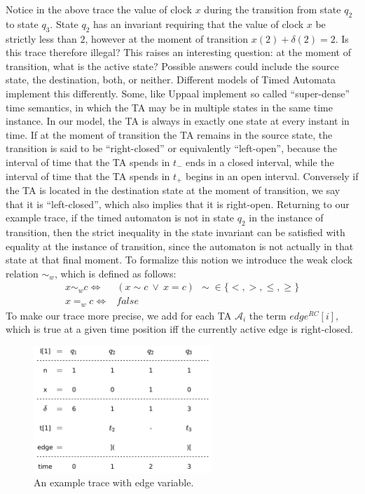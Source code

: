 \documentclass[a4paper,11pt]{report}
\theoremstyle{definition}
\begin{document}
Notice in the above trace the value of clock $x$ during the transition from
state $q_{2}$ to state $q_{3}$. State $q_{2}$ has an invariant requiring that
the value of clock $x$ be strictly less than $2$, however at the moment of
transition $x(2) + \delta(2) = 2$. Is this trace therefore illegal? This raises
an interesting question: at the moment of transition, what is the active state?
Possible answers could include the source state, the destination, both, or
neither. Different models of Timed Automata implement this differently. Some,
like Uppaal\cite{larsen97} implement so called ``super-dense'' time semantics,
in which the TA may be in multiple states in the same time instance. In our
model, the TA is always in exactly one state at every instant in time. If at the
moment of transition the TA remains in the source state, the transition is said
to be ``right-closed'' or equivalently ``left-open'', because the interval of
time that the TA spends in \(t_{-}\) ends in a closed interval, while the
interval of time that the TA spends in \(t_{+}\) begins in an open interval.
Conversely if the TA is located in the destination state at the moment of
transition, we say that it is ``left-closed'', which also implies that it is
right-open. Returning to our example trace, if the timed automaton is not in
state $q_{2}$ in the instance of transition, then the strict inequality in the
state invariant can be satisfied with equality at the instance of transition,
since the automaton is not actually in that state at that final moment. To
formalize this notion we introduce the weak clock relation $\sim_{w}$, which is
defined as follows:
\begin{align*}
  x \sim_{w} c  \iff & (x \sim c\ \lor\ x = c) \ \ \sim \in \{<,>,\leq,\geq\} \\
  x =_{w} c  \iff & false
\end{align*}
To make our trace more precise, we add for each TA $\mathcal{A}_{i}$ the term
$edge^{RC}[i]$, which is true at a given time position iff the currently active
edge is right-closed.

\begin{figure}[h]
  \centering
  \includegraphics[width=0.6\textwidth]{trace-shift-full}
  \caption{An example trace with edge variable.}
  \label{fig:trace-full}
\end{figure}
\end{document}
